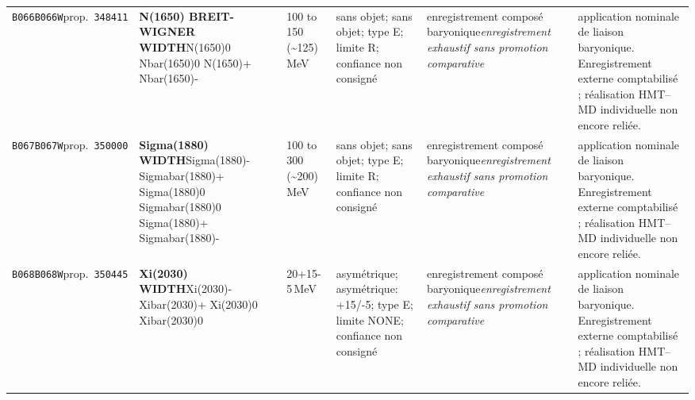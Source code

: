 \begin{landscape}
\begin{longtable}{L{1.85cm}L{4.45cm}L{2.35cm}L{4.05cm}L{3.35cm}L{7.15cm}}
\texttt{B066}\newline \texttt{B066W}\newline prop.\ \texttt{348411} & \textbf{N(1650) BREIT-WIGNER WIDTH}\newline N(1650)0 \textbar{}\allowbreak{} Nbar(1650)0 \textbar{}\allowbreak{} N(1650)+ \textbar{}\allowbreak{} Nbar(1650)- & 100 to 150 (\textasciitilde{}125)\,MeV & sans objet; sans objet; type E; limite R; confiance non consigné & enregistrement composé baryonique\newline \emph{enregistrement exhaustif sans promotion comparative} & application nominale de liaison baryonique. Enregistrement externe comptabilisé ; réalisation HMT--MD individuelle non encore reliée. \\
\texttt{B067}\newline \texttt{B067W}\newline prop.\ \texttt{350000} & \textbf{Sigma(1880) WIDTH}\newline Sigma(1880)- \textbar{}\allowbreak{} Sigmabar(1880)+ \textbar{}\allowbreak{} Sigma(1880)0 \textbar{}\allowbreak{} Sigmabar(1880)0 \textbar{}\allowbreak{} Sigma(1880)+ \textbar{}\allowbreak{} Sigmabar(1880)- & 100 to 300 (\textasciitilde{}200)\,MeV & sans objet; sans objet; type E; limite R; confiance non consigné & enregistrement composé baryonique\newline \emph{enregistrement exhaustif sans promotion comparative} & application nominale de liaison baryonique. Enregistrement externe comptabilisé ; réalisation HMT--MD individuelle non encore reliée. \\
\texttt{B068}\newline \texttt{B068W}\newline prop.\ \texttt{350445} & \textbf{Xi(2030) WIDTH}\newline Xi(2030)- \textbar{}\allowbreak{} Xibar(2030)+ \textbar{}\allowbreak{} Xi(2030)0 \textbar{}\allowbreak{} Xibar(2030)0 & 20+15-5\,MeV & asymétrique; asymétrique: +15/-5; type E; limite NONE; confiance non consigné & enregistrement composé baryonique\newline \emph{enregistrement exhaustif sans promotion comparative} & application nominale de liaison baryonique. Enregistrement externe comptabilisé ; réalisation HMT--MD individuelle non encore reliée. \\

\end{longtable}
\end{landscape}
